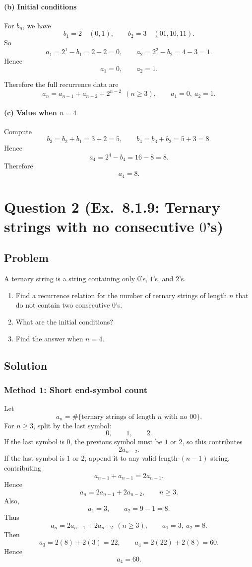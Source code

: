 \documentclass[12pt]{article}
\begin{document}
\paragraph{(b) Initial conditions}
For \(b_n\), we have
\[
b_1=2 \quad (0,1),\qquad b_2=3 \quad (01,10,11).
\]
So
\[
a_1=2^1-b_1=2-2=0,
\qquad
a_2=2^2-b_2=4-3=1.
\]
Hence
\[
\boxed{a_1=0,\qquad a_2=1.}
\]

Therefore the full recurrence data are
\[
\boxed{a_n=a_{n-1}+a_{n-2}+2^{n-2}\ \ (n\ge 3),\qquad a_1=0,\ a_2=1.}
\]

\paragraph{(c) Value when \(n=4\)}
Compute
\[
b_3=b_2+b_1=3+2=5,\qquad b_4=b_3+b_2=5+3=8.
\]
Hence
\[
a_4=2^4-b_4=16-8=8.
\]
Therefore
\[
\boxed{a_4=8.}
\]

\newpage
\section{Question 2 (Ex.\ 8.1.9: Ternary strings with no consecutive $0$'s)}

\subsection{Problem}
A ternary string is a string containing only $0$'s, $1$'s, and $2$'s.
\begin{enumerate}[label=(\alph*)]
\item Find a recurrence relation for the number of ternary strings of length $n$ that do not contain two consecutive $0$'s.
\item What are the initial conditions?
\item Find the answer when $n=4$.
\end{enumerate}

\subsection{Solution}

\subsubsection*{Method 1: Short end-symbol count}
Let
\[
a_n=\#\{\text{ternary strings of length }n\text{ with no }00\}.
\]
For \(n\ge 3\), split by the last symbol:
\[
0,\qquad 1,\qquad 2.
\]
If the last symbol is \(0\), the previous symbol must be \(1\) or \(2\), so this contributes
\[
2a_{n-2}.
\]
If the last symbol is \(1\) or \(2\), append it to any valid length-\((n-1)\) string, contributing
\[
a_{n-1}+a_{n-1}=2a_{n-1}.
\]
Hence
\[
a_n=2a_{n-1}+2a_{n-2}, \qquad n\ge 3.
\]
Also,
\[
a_1=3,\qquad a_2=9-1=8.
\]
Thus
\[
\boxed{a_n=2a_{n-1}+2a_{n-2}\ \ (n\ge 3),\qquad a_1=3,\ a_2=8.}
\]
Then
\[
a_3=2(8)+2(3)=22,\qquad a_4=2(22)+2(8)=60.
\]
Hence
\[
\boxed{a_4=60.}
\]
\end{document}
